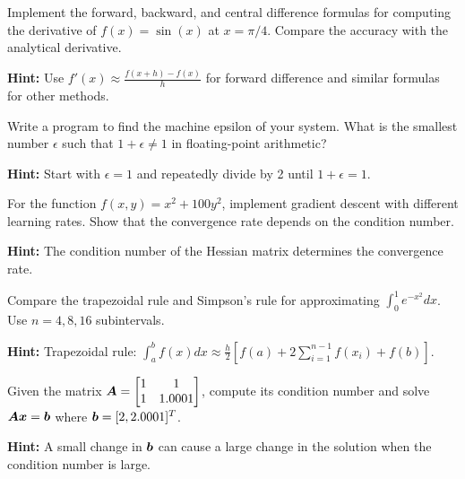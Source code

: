 \begin{problem}
\label{prob:numerical-diff}
Implement the forward, backward, and central difference formulas for computing the derivative of $f(x) = \sin(x)$ at $x = \pi/4$. Compare the accuracy with the analytical derivative.

\textbf{Hint:} Use $f'(x) \approx \frac{f(x+h) - f(x)}{h}$ for forward difference and similar formulas for other methods.
\end{problem}

\begin{problem}
\label{prob:machine-epsilon}
Write a program to find the machine epsilon of your system. What is the smallest number $\epsilon$ such that $1 + \epsilon \neq 1$ in floating-point arithmetic?

\textbf{Hint:} Start with $\epsilon = 1$ and repeatedly divide by 2 until $1 + \epsilon = 1$.
\end{problem}

\begin{problem}
\label{prob:gradient-convergence}
For the function $f(x, y) = x^2 + 100y^2$, implement gradient descent with different learning rates. Show that the convergence rate depends on the condition number.

\textbf{Hint:} The condition number of the Hessian matrix determines the convergence rate.
\end{problem}

\begin{problem}
\label{prob:numerical-integration}
Compare the trapezoidal rule and Simpson's rule for approximating $\int_0^1 e^{-x^2} dx$. Use $n = 4, 8, 16$ subintervals.

\textbf{Hint:} Trapezoidal rule: $\int_a^b f(x)dx \approx \frac{h}{2}[f(a) + 2\sum_{i=1}^{n-1}f(x_i) + f(b)]$.
\end{problem}

\begin{problem}
\label{prob:matrix-conditioning}
Given the matrix $\boldsymbol{A} = \begin{bmatrix} 1 & 1 \\ 1 & 1.0001 \end{bmatrix}$, compute its condition number and solve $\boldsymbol{A}\boldsymbol{x} = \boldsymbol{b}$ where $\boldsymbol{b} = [2, 2.0001]^T$.

\textbf{Hint:} A small change in $\boldsymbol{b}$ can cause a large change in the solution when the condition number is large.
\end{problem}

